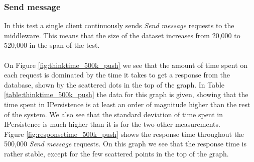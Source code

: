 \documentclass{article}
\begin{document}
            \subsubsection{Send message}
                \label{sec:micro_send_message}
                In this test a single client continuously sends \textit{Send message} requests to the middleware. This means that the size of the dataset increases from 20,000 to 520,000 in the span of the test.\\
                \\
                On Figure \ref{fig:thinktime_500k_push} we see that the amount of time spent on each request is dominated by the time it takes to get a response from the database, shown by the scattered dots in the top of the graph. In Table \ref{table:thinktime_500k_push} the data for this graph is given, showing that the time spent in IPersistence is at least an order of magnitude higher than the rest of the system. We also see that the standard deviation of time spent in IPersistence is much higher than it is for the two other measurements.\\
                Figure \ref{fig:responsetime_500k_push} shows the response time throughout the 500,000 \textit{Send message} requests. On this graph we see that the response time is rather stable, except for the few scattered points in the top of the graph.
\end{document}
